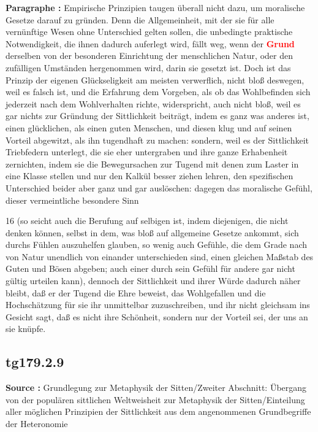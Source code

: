 \documentclass[a4paper,12pt,twoside]{book}
\newcommand{\match}[1]{\textcolor{red}{\textbf{#1}}}
\begin{document}
	\noindent\textbf{Paragraphe : }
	Empirische Prinzipien taugen überall nicht dazu, um moralische Gesetze darauf zu gründen. Denn die Allgemeinheit, mit der sie für alle vernünftige Wesen ohne Unterschied gelten sollen, die unbedingte praktische Notwendigkeit, die ihnen dadurch auferlegt wird, fällt weg, wenn der \match{Grund} derselben von der besonderen Einrichtung der menschlichen Natur, oder den zufälligen Umständen hergenommen wird, darin sie gesetzt ist. Doch  ist das Prinzip der eigenen Glückseligkeit am meisten verwerflich, nicht bloß deswegen, weil es falsch ist, und die Erfahrung dem Vorgeben, als ob das Wohlbefinden sich jederzeit nach dem Wohlverhalten richte, widerspricht, auch nicht bloß, weil es gar nichts zur Gründung der Sittlichkeit beiträgt, indem es ganz was anderes ist, einen glücklichen, als einen guten Menschen, und diesen klug und auf seinen Vorteil abgewitzt, als ihn tugendhaft zu machen: sondern, weil es der Sittlichkeit Triebfedern unterlegt, die sie eher untergraben und ihre ganze Erhabenheit zernichten, indem sie die Bewegursachen zur Tugend mit denen zum Laster in eine Klasse stellen und nur den Kalkül besser ziehen lehren, den spezifischen Unterschied beider aber ganz und gar auslöschen: dagegen das moralische Gefühl, dieser vermeintliche besondere Sinn
	
	
	16
	(so seicht auch die Berufung auf selbigen ist, indem diejenigen, die nicht denken können, selbst in dem, was bloß auf allgemeine Gesetze ankommt, sich durchs Fühlen auszuhelfen glauben, so wenig auch Gefühle, die dem Grade nach von Natur unendlich von einander unterschieden sind, einen gleichen Maßstab des Guten und Bösen abgeben; auch einer durch sein Gefühl für andere gar nicht gültig urteilen kann), dennoch der Sittlichkeit und ihrer Würde dadurch näher bleibt, daß er der Tugend die Ehre beweist, das Wohlgefallen und die Hochschätzung für sie ihr unmittelbar zuzuschreiben, und ihr nicht gleichsam ins Gesicht sagt, daß es nicht ihre Schönheit, sondern nur der Vorteil sei, der uns an sie knüpfe. 
	
	\subsection*{tg179.2.9} 
	\textbf{Source : }Grundlegung zur Metaphysik der Sitten/Zweiter Abschnitt: Übergang von der populären sittlichen Weltweisheit zur Metaphysik der Sitten/Einteilung aller möglichen Prinzipien der Sittlichkeit aus dem angenommenen Grundbegriffe der Heteronomie\\  
	
\end{document}
